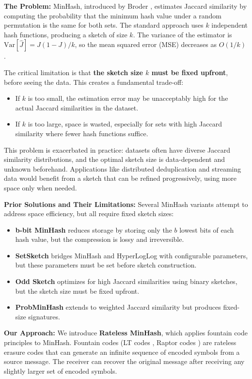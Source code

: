 \documentclass[11pt,letterpaper]{article}
\begin{document}
\textbf{The Problem:} MinHash, introduced by Broder \cite{Broder1997}, estimates Jaccard similarity by computing the probability that the minimum hash value under a random permutation is the same for both sets. The standard approach uses $k$ independent hash functions, producing a sketch of size $k$. The variance of the estimator is $\text{Var}[\hat{J}] = J(1-J)/k$, so the mean squared error (MSE) decreases as $O(1/k)$ \cite{Broder1997}.

The critical limitation is that \textbf{the sketch size $k$ must be fixed upfront}, before seeing the data. This creates a fundamental trade-off:
\begin{itemize}
    \item If $k$ is too small, the estimation error may be unacceptably high for the actual Jaccard similarities in the dataset.
    \item If $k$ is too large, space is wasted, especially for sets with high Jaccard similarity where fewer hash functions suffice.
\end{itemize}

This problem is exacerbated in practice: datasets often have diverse Jaccard similarity distributions, and the optimal sketch size is data-dependent and unknown beforehand. Applications like distributed deduplication and streaming data would benefit from a sketch that can be refined progressively, using more space only when needed.

\textbf{Prior Solutions and Their Limitations:} Several MinHash variants attempt to address space efficiency, but all require fixed sketch sizes:
\begin{itemize}
    \item \textbf{b-bit MinHash} \cite{Li2009} reduces storage by storing only the $b$ lowest bits of each hash value, but the compression is lossy and irreversible.
    \item \textbf{SetSketch} \cite{Ertl2021} bridges MinHash and HyperLogLog with configurable parameters, but these parameters must be set before sketch construction.
    \item \textbf{Odd Sketch} \cite{Mitzenmacher2014} optimizes for high Jaccard similarities using binary sketches, but the sketch size must be fixed upfront.
    \item \textbf{ProbMinHash} \cite{Ertl2019} extends to weighted Jaccard similarity but produces fixed-size signatures.
\end{itemize}

\textbf{Our Approach:} We introduce \textbf{Rateless MinHash}, which applies fountain code principles to MinHash. Fountain codes (LT codes \cite{Luby2002}, Raptor codes \cite{Shokrollahi2006}) are rateless erasure codes that can generate an infinite sequence of encoded symbols from a source message. The receiver can recover the original message after receiving any slightly larger set of encoded symbols.
\end{document}
